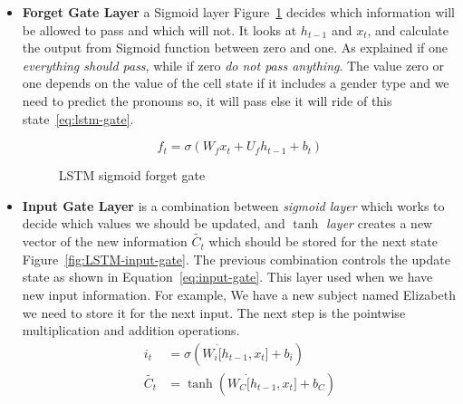 \begin{itemize}
  
\item \textbf{Forget Gate Layer} a Sigmoid layer Figure~\ref{fig:LSTM-forget-gate} decides which information will be allowed to pass and which will not. It looks at $h_{t-1}$ and $x_t$, and calculate the output from Sigmoid function between zero and one. As explained if one \textit{everything should pass}, while if zero \textit{do not pass anything}. The value zero or one depends on the value of the cell state if it includes a gender type and we need to predict the pronouns so, it will pass else it will ride of this state~\eqref{eq:lstm-gate}.

\begin{equation}\label{eq:lstm-gate}
f_t  = \sigma(W_f  x_t + U_f h_{t-1} + b_t)
\end{equation}

\begin{figure}[ht!]
    \centering
        
        \caption{LSTM sigmoid forget gate~\cite{colah}}\label{fig:LSTM-forget-gate}
\end{figure}



\item \textbf{Input Gate Layer} is a combination between \textit{sigmoid layer} which works to decide which values we should be updated, and \textit{$\tanh$ layer} creates a new vector of the new information $\tilde{C_t}$ which should be stored for the next state Figure~\ref{fig:LSTM-input-gate}. The previous combination controls the update state as shown in Equation~\eqref{eq:input-gate}. This layer used when we have new input information. For example, We have a new subject named Elizabeth we need to store it for the next input. The next step is the pointwise multiplication and addition operations.
\begin{subequations}\label{eq:input-gate}
\begin{align}
  i_t  &= \sigma(W_i \dot[h_{t-1},x_t] + b_i)\\
\widetilde{C_t} &= \tanh(W_C\dot [h_{t-1},x_t]+ b_C)
\end{align}
\end{subequations}



\end{itemize}
